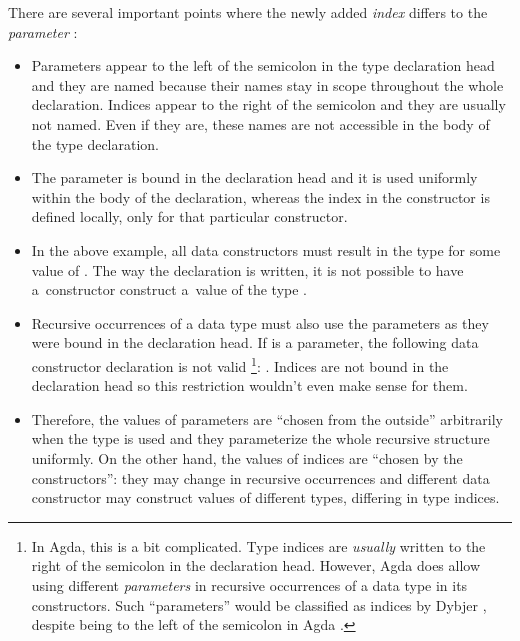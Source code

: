 There are several important points where the newly added \emph{index} differs to
the \emph{parameter} :
\begin{itemize}

	\item Parameters appear to the left of the semicolon in the type declaration head
		and they are named because their names stay in scope throughout the whole declaration.
		Indices appear to the right of the semicolon and they are usually not named.
		Even if they are, these names are not accessible in the body of the type declaration.

	\item The parameter  is bound in the declaration head and it is used
		uniformly within the body of the declaration, whereas the index 
		in the constructor \ident{\_::\_} is defined locally, only for that particular
		constructor.
		
	\item In the above example, all data constructors must result in the type 
		for some value of . The way the declaration is written, it is not possible to have
		a~constructor construct a~value of the type .
		
	\item Recursive occurrences of a data type must also use the parameters as they were bound
		in the declaration head.
		If  is a parameter, the following data constructor declaration is not valid%
		\footnote{In Agda, this is a bit complicated. Type indices are \emph{usually} written
			to the right of the semicolon in the declaration head. However, Agda does allow
			using different \emph{parameters} in recursive occurrences of a data type in its
			constructors. Such ``parameters'' would be classified as indices by Dybjer
			\cite{dybjer97}, despite being to the left of the semicolon in Agda \cite{mcbride08}.}:
		. Indices are not bound in the
		declaration head so this restriction wouldn't even make sense for them.
		
	\item Therefore, the values of parameters are ``chosen from the outside'' arbitrarily
		when the type is used and they parameterize the whole recursive structure uniformly.
		On the other hand, the values of indices are ``chosen by the constructors'': they
		may change in recursive occurrences and different data constructor may construct values
		of different types, differing in type indices.
		

\end{itemize}
